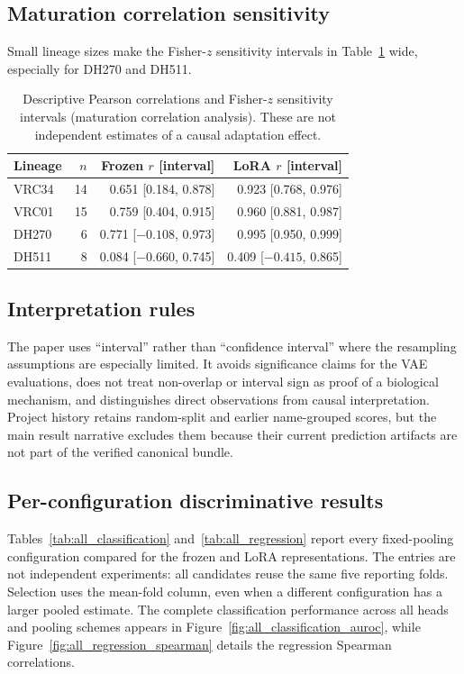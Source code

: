 \subsection{Maturation correlation sensitivity}

\noindent Small lineage sizes make the Fisher-$z$ sensitivity intervals in
Table~\ref{tab:tier2} wide, especially for DH270 and DH511.

\begin{table}[!htbp]
\centering
\scriptsize
\setlength{\tabcolsep}{3pt}
\begin{tabular}{lrrr}
\toprule
Lineage & $n$ & Frozen $r$ [interval] & LoRA $r$ [interval] \\
\midrule
VRC34 & 14 & 0.651 [0.184, 0.878] & 0.923 [0.768, 0.976] \\
VRC01 & 15 & 0.759 [0.404, 0.915] & 0.960 [0.881, 0.987] \\
DH270 & 6  & 0.771 [$-0.108$, 0.973] & 0.995 [0.950, 0.999] \\
DH511 & 8  & 0.084 [$-0.660$, 0.745] & 0.409 [$-0.415$, 0.865] \\
\bottomrule
\end{tabular}
\caption{Descriptive Pearson correlations and Fisher-$z$ sensitivity intervals (maturation correlation analysis). These are not independent estimates of a causal adaptation effect.}
\label{tab:tier2}
\end{table}

\subsection{Interpretation rules}

The paper uses ``interval'' rather than ``confidence interval'' where the
resampling assumptions are especially limited. It avoids significance claims for
the VAE evaluations, does not treat non-overlap or interval sign as proof of a
biological mechanism, and distinguishes direct observations from causal
interpretation. Project history retains random-split and earlier name-grouped
scores, but the main result narrative excludes them because their
current prediction artifacts are not part of the verified canonical bundle.

\subsection{Per-configuration discriminative results}

Tables~\ref{tab:all_classification} and~\ref{tab:all_regression} report every
fixed-pooling configuration compared for the frozen and LoRA representations.
The entries are not independent experiments: all candidates reuse the same five
reporting folds. Selection uses the mean-fold column, even when a different
configuration has a larger pooled estimate. The complete classification
performance across all heads and pooling schemes appears in
Figure~\ref{fig:all_classification_auroc}, while
Figure~\ref{fig:all_regression_spearman} details the regression Spearman
correlations.


